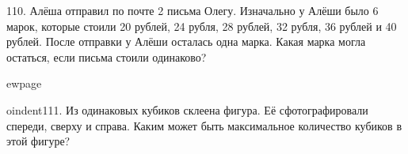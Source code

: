 110. Алёша отправил по почте 2 письма Олегу. Изначально у Алёши было 6 марок, которые стоили 20 рублей, 24 рубля, 28 рублей, 32 рубля, 36 рублей и 40 рублей. После отправки у Алёши осталась одна марка. Какая марка могла остаться, если письма стоили одинаково?

ewpage

oindent111. Из одинаковых кубиков склеена фигура. Её сфотографировали спереди, сверху и справа. Каким может быть максимальное количество кубиков в этой фигуре?
\begin{center}
\begin{figure}[ht!]
\end{figure}
\end{center}
